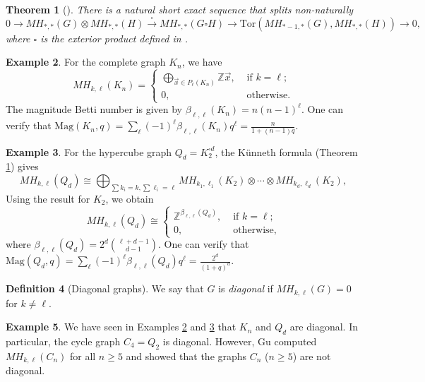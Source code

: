 \documentclass{amsart}
\numberwithin{equation}{section}
\newtheorem{thm}{Theorem}[section]
\theoremstyle{plain}
\theoremstyle{remark}
\theoremstyle{definition}
\newtheorem{defn}[thm]{Definition}
\newtheorem{ex}[thm]{Example}
\numberwithin{equation}{section}
\newcommand{\Z}{\mathbb{Z}}
\newcommand{\Mag}{\mathrm{Mag}}
\begin{document}
\begin{thm}[{\cite[Theorem 5.3]{Hepworth2017}}]\label{Kunneth}
There is a natural short exact sequence that splits non-naturally
\[
0\to MH_{*,*}(G)\otimes MH_{*,*}(H)\xrightarrow{\square} MH_{*,*}(G\square H)\to \mathrm{Tor}(MH_{*-1,*}(G),MH_{*,*}(H))\to 0,
\]
where $\square$ is the exterior product defined in \cite[Definition 5.2]{Hepworth2017}.
\end{thm}

\begin{ex}\label{complete_graph}
    For the complete graph $K_n$, we have
    \[
    MH_{k,\ell}(K_n)=\begin{cases}
    \bigoplus_{\Vec{x}\in P_{\ell}(K_n)}\Z\Vec{x}, & \text{ if } k=\ell;\\
    0, & \text{ otherwise}.
    \end{cases}
    \]
The magnitude Betti number is given by $\beta_{\ell,\ell}(K_n)=n(n-1)^{\ell}$.
One can verify that
$\Mag(K_n,q)=\sum_{\ell}(-1)^{\ell}\beta_{\ell,\ell}(K_n)q^{\ell}=\frac{n}{1+(n-1)q}$.
\end{ex}

\begin{ex}\label{hypercube}
    For the hypercube graph $Q_d=K_2^{\square d}$, the K\"unneth formula (Theorem \ref{Kunneth}) gives
    \[
    MH_{k,\ell}(Q_d)\cong\bigoplus_{\sum k_i=k, \sum \ell_i=\ell}MH_{k_1,\ell_1}(K_2)\otimes\cdots\otimes MH_{k_d,\ell_d}(K_2),
    \]
    Using the result for $K_2$, we obtain
    \[
    MH_{k,\ell}(Q_d)\cong\begin{cases}
    \Z^{\beta_{\ell,\ell}(Q_d)}, & \text{ if } k=\ell;\\
    0, & \text{ otherwise},
\end{cases}
\]
where $\beta_{\ell,\ell}(Q_d)=2^d\binom{\ell+d-1}{d-1}$. One can verify that
$\Mag(Q_d,q)=\sum_{\ell}(-1)^{\ell}\beta_{\ell,\ell}(Q_d)q^{\ell}=\frac{2^d}{(1+q)^d}$.
\end{ex}


\begin{defn}[Diagonal graphs]
    We say that $G$ is \emph{diagonal} if $MH_{k,\ell}(G)=0$ for $k\neq\ell$.
\end{defn}

\begin{ex}\label{diag}
    We have seen in Examples \ref{complete_graph} and \ref{hypercube} that $K_n$ and $Q_d$ are diagonal. In particular, the cycle graph $C_4=Q_2$ is diagonal. However, Gu \cite{Gu2018} computed $MH_{k,\ell}(C_n)$ for all $n\geq 5$ and showed that the graphs $C_n$ ($n\geq 5$) are not diagonal.
\end{ex}
\end{document}
